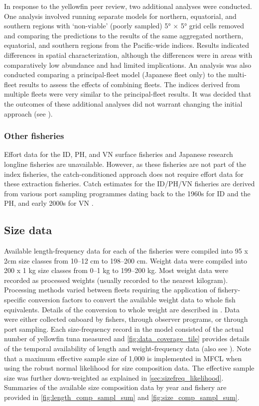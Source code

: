In response to the yellowfin peer review, two additional analyses were conducted. One analysis involved running separate models for northern, equatorial, and southern regions with `non-viable' (poorly sampled) 5° $\times$ 5° grid cells removed and comparing the predictions to the results of the same aggregated northern, equatorial, and southern regions from the Pacific-wide indices. Results indicated differences in spatial characterization, although the differences were in areas with comparatively low abundance and had limited implications. An analysis was also conducted comparing a principal-fleet model (Japanese fleet only) to the multi-fleet results to assess the effects of combining fleets. The indices derived from multiple fleets were very similar to the principal-fleet results. It was decided that the outcomes of these additional analyses did not warrant changing the initial approach (see \citet{teears_cpue_2023}).

\subsubsection{Other fisheries}
\label{sec:catch_effort_other}

Effort data for the ID, PH, and VN surface fisheries and Japanese research longline fisheries are unavailable. However, as these fisheries are not part of the index fisheries, the catch-conditioned approach does not require effort data for these extraction fisheries. Catch estimates for the ID/PH/VN fisheries are derived from various port sampling programmes dating back to the 1960s for ID and the PH, and early 2000s for VN \citep{williams_overview_2023}.

\subsection{Size data}
\label{sec:size_data}

Available length-frequency data for each of the fisheries were compiled into 95 x 2cm size classes from 10--12 cm to 198--200 cm. Weight data were compiled into 200 x 1 kg size classes from 0--1 kg to 199--200 kg. Most weight data were recorded as processed weights (usually recorded to the nearest kilogram). Processing methods varied between fleets requiring the application of fishery-specific conversion factors to convert the available weight data to whole fish equivalents. Details of the conversion to whole weight are described in \citet{macdonald_project_2023}. Data were either collected onboard by fishers, through observer programs, or through port sampling. Each size-frequency record in the model consisted of the actual number of yellowfin tuna measured and \autoref{fig:data_coverage_tile} provides details of the temporal availability of length and weight-frequency data (also see \citealp{teears_cpue_2023}). Note that a maximum effective sample size of 1,000 is implemented in MFCL when using the robust normal likelihood for size composition data. The effective sample size was further down-weighted as explained in \autoref{sec:sizefreq_likelihood}. Summaries of the available size composition data by year and fishery are provided in \autoref{fig:length_comp_sampl_sum} and \autoref{fig:size_comp_sampl_sum}.


